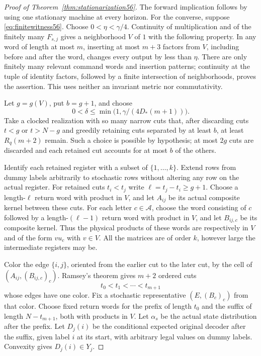 \begin{proof}[Proof of Theorem~\ref{thm:stationarization56}]
The forward implication follows by using one stationary machine at every horizon. For the converse, suppose \eqref{eq:finitewitness56}. Choose $0<\eta<\gamma/4$. Continuity of multiplication and of the finitely many $F_{s,j}$ gives a neighborhood $V$ of $1$ with the following property. In any word of length at most $m$, inserting at most $m+3$ factors from $V$, including before and after the word, changes every output by less than $\eta$. There are only finitely many relevant command words and insertion patterns; continuity at the tuple of identity factors, followed by a finite intersection of neighborhoods, proves the assertion. This uses neither an invariant metric nor commutativity.

Let $g=g(V)$, put $b=g+1$, and choose
\[
       0<\delta\le \min\bigl(1,\gamma/(4D_*(m+1))\bigr).
\]
Take a clocked realization with so many narrow cuts that, after discarding cuts $t<g$ or $t>N-g$ and greedily retaining cuts separated by at least $b$, at least $R_q(m+2)$ remain. Such a choice is possible by hypothesis; at most $2g$ cuts are discarded and each retained cut accounts for at most $b$ of the others.

Identify each retained register with a subset of $\{1,\ldots,k\}$. Extend rows from dummy labels arbitrarily to stochastic rows without altering any row on the actual register. For retained cuts $t_i<t_j$ write $\ell=t_j-t_i\ge g+1$. Choose a length-$\ell$ return word with product in $V$, and let $A_{ij}$ be its actual composite kernel between these cuts. For each letter $c\in\mathcal A$, choose the word consisting of $c$ followed by a length-$(\ell-1)$ return word with product in $V$, and let $B_{ij,c}$ be its composite kernel. Thus the physical products of these words are respectively in $V$ and of the form $v u_c$ with $v\in V$. All the matrices are of order $k$, however large the intermediate registers may be.

Color the edge $\{i,j\}$, oriented from the earlier cut to the later cut, by the cell of $(A_{ij},(B_{ij,c})_c)$. Ramsey's theorem gives $m+2$ ordered cuts
\[
                         t_0<t_1<\cdots<t_{m+1}
\]
whose edges have one color. Fix a stochastic representative $(E,(B_c)_c)$ from that color. Choose fixed return words for the prefix of length $t_0$ and the suffix of length $N-t_{m+1}$, both with products in $V$. Let $\alpha_s$ be the actual state distribution after the prefix. Let $D_j(i)$ be the conditional expected original decoder after the suffix, given label $i$ at its start, with arbitrary legal values on dummy labels. Convexity gives $D_j(i)\in Y_j$.


\end{proof}
